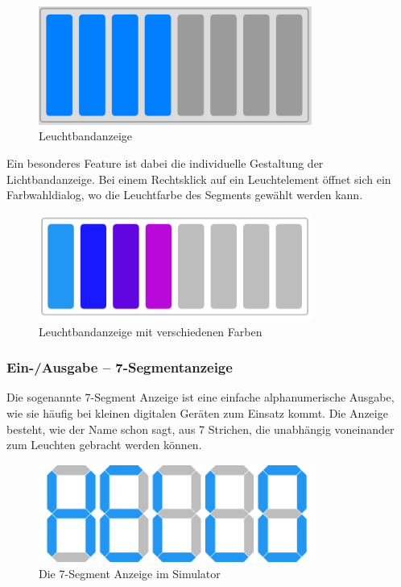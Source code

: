 \begin{figure}[ht]
	\centering
  \includegraphics[width=0.8\textwidth]{Images/Lightstrip}
	\caption{Leuchtbandanzeige}
	\label{Lightstrip}
\end{figure}

Ein besonderes Feature ist dabei die individuelle Gestaltung der
Lichtbandanzeige. Bei einem Rechtsklick auf ein Leuchtelement öffnet sich ein
Farbwahldialog, wo die Leuchtfarbe des Segments gewählt werden kann.

\begin{figure}[ht]
	\centering
  \includegraphics[width=0.8\textwidth]{Images/Lightstrip_colors}
	\caption{Leuchtbandanzeige mit verschiedenen Farben}
	\label{Lightstrip_Colors}
\end{figure}


\subsubsection{Ein-/Ausgabe -- 7-Segmentanzeige}
Die sogenannte 7-Segment Anzeige ist eine einfache alphanumerische Ausgabe, wie
sie häufig bei kleinen digitalen Geräten zum Einsatz kommt. Die Anzeige besteht, wie
der Name schon sagt, aus 7 Strichen, die unabhängig voneinander zum Leuchten
gebracht werden können.

\begin{figure}[ht]
	\centering
  \includegraphics[width=0.8\textwidth]{Images/7-Segment_Hello}
	\caption{Die 7-Segment Anzeige im Simulator}
	\label{7-Segment}
\end{figure}


